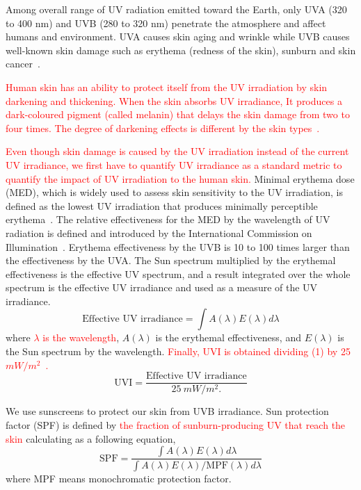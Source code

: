 \documentclass[journal]{IEEEtran}
\begin{document}
Among overall range of UV radiation emitted toward the Earth, only UVA (320 to 400 nm) and UVB (280 to 320 nm) penetrate the atmosphere and affect humans and environment. UVA causes skin aging and wrinkle while UVB causes well-known skin damage such as erythema (redness of the skin), sunburn and skin cancer~\cite{Matsumura:TAP04}.

\textcolor{red}{Human skin has an ability to protect itself from the UV irradiation by skin darkening and thickening. When the skin absorbs UV irradiance, It produces a dark-coloured pigment (called melanin) that delays the skin damage from two to four times. The degree of darkening effects is different by the skin types~\cite{Harrison:Method02}.}

\textcolor{red}{Even though skin damage is caused by the UV irradiation instead of the current UV irradiance, we first have to quantify UV irradiance as  a standard metric to quantify the impact of UV irradiation to the human skin.}
Minimal erythema dose (MED), which is widely used to assess skin sensitivity to the UV irradiation, is defined as the lowest UV irradiation that produces minimally perceptible erythema~\cite{Diffey:CPPM91}. The relative effectiveness for the MED by the wavelength of UV radiation is defined and introduced by the International Commission on Illumination~\cite{CIE}. Erythema effectiveness by the UVB is 10 to 100 times larger than the effectiveness by the UVA. The Sun spectrum multiplied by the erythemal effectiveness is the effective UV spectrum, and a result integrated over the whole spectrum is the effective UV irradiance and used as a measure of the UV irradiance.
\begin{equation}
\text{Effective~UV~irradiance} = \int A(\lambda)E(\lambda) d \lambda
 \end{equation}
where \textcolor{red}{$\lambda$ is the wavelength}, $A(\lambda)$ is the erythemal effectiveness, and $E(\lambda)$ is the Sun spectrum by the wavelength. \textcolor{red}{Finally, UVI is obtained dividing (1) by 25 $mW/m^2$~\cite{CIE}.}
\begin{equation}
\text{UVI}= \frac{\text{Effective~UV~irradiance}}{25~mW/m^2.}
 \end{equation}

We use sunscreens to protect our skin from UVB irradiance. Sun protection factor (SPF) is defined by \textcolor{red}{the fraction of sunburn-producing UV that reach the skin} calculating as a following equation,
\begin{equation}
\text{SPF} = \frac{\int A(\lambda)E(\lambda) d \lambda}{\int A(\lambda)E(\lambda) / \text{MPF}(\lambda) d \lambda}
 \end{equation}
where MPF means monochromatic protection factor.
\end{document}
